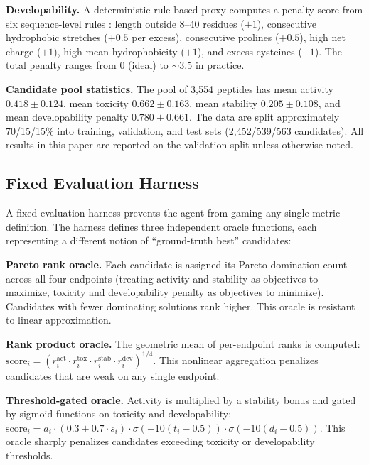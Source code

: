 \textbf{Developability.}
A deterministic rule-based proxy computes a penalty score from six sequence-level rules \citep{fjell2012peptidedev}: length outside 8--40 residues ($+1$), consecutive hydrophobic stretches ($+0.5$ per excess), consecutive prolines ($+0.5$), high net charge ($+1$), high mean hydrophobicity ($+1$), and excess cysteines ($+1$).
The total penalty ranges from 0 (ideal) to ${\sim}3.5$ in practice.

\textbf{Candidate pool statistics.}
The pool of 3{,}554 peptides has mean activity $0.418 \pm 0.124$, mean toxicity $0.662 \pm 0.163$, mean stability $0.205 \pm 0.108$, and mean developability penalty $0.780 \pm 0.661$.
The data are split approximately 70/15/15\% into training, validation, and test sets (2{,}452/539/563 candidates).
All results in this paper are reported on the validation split unless otherwise noted.

\subsection{Fixed Evaluation Harness}
\label{sec:evaluation_harness}

A fixed evaluation harness prevents the agent from gaming any single metric definition.
The harness defines three independent oracle functions, each representing a different notion of ``ground-truth best'' candidates:

\textbf{Pareto rank oracle.}
Each candidate is assigned its Pareto domination count across all four endpoints (treating activity and stability as objectives to maximize, toxicity and developability penalty as objectives to minimize).
Candidates with fewer dominating solutions rank higher.
This oracle is resistant to linear approximation.

\textbf{Rank product oracle.}
The geometric mean of per-endpoint ranks is computed: $\text{score}_i = (r^\text{act}_i \cdot r^\text{tox}_i \cdot r^\text{stab}_i \cdot r^\text{dev}_i)^{1/4}$.
This nonlinear aggregation penalizes candidates that are weak on any single endpoint.

\textbf{Threshold-gated oracle.}
Activity is multiplied by a stability bonus and gated by sigmoid functions on toxicity and developability: $\text{score}_i = a_i \cdot (0.3 + 0.7 \cdot s_i) \cdot \sigma(-10(t_i - 0.5)) \cdot \sigma(-10(d_i - 0.5))$.
This oracle sharply penalizes candidates exceeding toxicity or developability thresholds.

